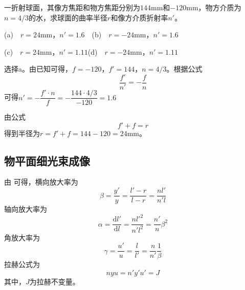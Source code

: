 \documentclass[cn,10pt,chinesefont=founder,math=mtpro2,cite=super,toc=onecol,twoside,openany]{elegantbook}
\begin{document}
\begin{problem}
	一折射球面，其像方焦距和物方焦距分别为$144\mathrm{mm}$和$-120\mathrm{mm}$，物方介质为$n=4/3$的水，求球面的曲率半径$r$和像方介质折射率$n'$。
	
	(a)\ \ $r=24\mathrm{mm}$，$n'=1.6$\ \ \qquad\qquad\qquad\qquad\qquad (b)\ \ $r=-24\mathrm{mm}$，$n'=1.6$
	
	(c)\ \ $r=24\mathrm{mm}$，$n'=1.11$\qquad\qquad\qquad\qquad\qquad (d)\ \ $r=-24\mathrm{mm}$，$n'=1.11$
\end{problem}
\begin{solution}
	选择a。由已知可得，$f=-120$，$f'=144$，$n=4/3$。根据公式
	\begin{equation}
	\frac{f'}{n'}=-\frac{f}{n}
	\end{equation}
	可得$n'=-\dfrac{f'\cdot n}{f}=-\dfrac{144\cdot 4/3}{-120}=1.6$
	
	由公式
	\begin{equation}
	f'+f=r
	\end{equation}
	得到半径为$r=f'+f=144-120=24\mathrm{mm}$。
\end{solution}

\subsection{物平面细光束成像}
\label{subsect:three-magnification}

由 可得，横向放大率为
\begin{equation}
\beta=\frac{y'}{y}=\frac{l'-r}{l-r}=\frac{nl'}{n'l}
\end{equation}
轴向放大率为
\begin{equation}
\alpha=\frac{\mathrm{d}l'}{\mathrm{d}l}=\frac{nl'^2}{n'l^2}=\frac{n'}{n}\beta^2
\end{equation}
角放大率为
\begin{equation}
\gamma=\frac{u'}{u}=\frac{l}{l'}=\frac{n}{n'}\frac{1}{\beta}
\end{equation}
拉赫公式为
\begin{equation}
nyu=n'y'u'=J
\end{equation}
其中，$J$为拉赫不变量。
\end{document}
